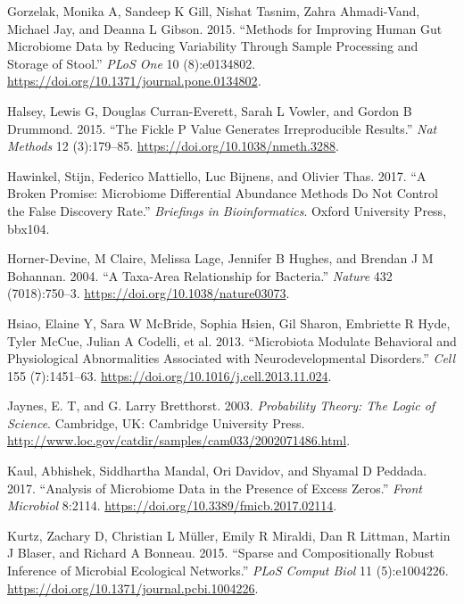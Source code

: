 \documentclass[onecolumn]{book}
\theoremstyle{definition}
\theoremstyle{definition}
\theoremstyle{definition}
\theoremstyle{remark}
\begin{document}
\leavevmode\hypertarget{ref-Gorzelak:2015aa}{}%
Gorzelak, Monika A, Sandeep K Gill, Nishat Tasnim, Zahra Ahmadi-Vand,
Michael Jay, and Deanna L Gibson. 2015. ``Methods for Improving Human
Gut Microbiome Data by Reducing Variability Through Sample Processing
and Storage of Stool.'' \emph{PLoS One} 10 (8):e0134802.
\url{https://doi.org/10.1371/journal.pone.0134802}.

\leavevmode\hypertarget{ref-Halsey:2015aa}{}%
Halsey, Lewis G, Douglas Curran-Everett, Sarah L Vowler, and Gordon B
Drummond. 2015. ``The Fickle P Value Generates Irreproducible Results.''
\emph{Nat Methods} 12 (3):179--85.
\url{https://doi.org/10.1038/nmeth.3288}.

\leavevmode\hypertarget{ref-hawinkel2017}{}%
Hawinkel, Stijn, Federico Mattiello, Luc Bijnens, and Olivier Thas.
2017. ``A Broken Promise: Microbiome Differential Abundance Methods Do
Not Control the False Discovery Rate.'' \emph{Briefings in
Bioinformatics}. Oxford University Press, bbx104.

\leavevmode\hypertarget{ref-Horner-Devine:2004aa}{}%
Horner-Devine, M Claire, Melissa Lage, Jennifer B Hughes, and Brendan J
M Bohannan. 2004. ``A Taxa-Area Relationship for Bacteria.''
\emph{Nature} 432 (7018):750--3.
\url{https://doi.org/10.1038/nature03073}.

\leavevmode\hypertarget{ref-Hsiao:2013}{}%
Hsiao, Elaine Y, Sara W McBride, Sophia Hsien, Gil Sharon, Embriette R
Hyde, Tyler McCue, Julian A Codelli, et al. 2013. ``Microbiota Modulate
Behavioral and Physiological Abnormalities Associated with
Neurodevelopmental Disorders.'' \emph{Cell} 155 (7):1451--63.
\url{https://doi.org/10.1016/j.cell.2013.11.024}.

\leavevmode\hypertarget{ref-Jaynes:2003}{}%
Jaynes, E. T, and G. Larry Bretthorst. 2003. \emph{Probability Theory:
The Logic of Science}. Cambridge, UK: Cambridge University Press.
\url{http://www.loc.gov/catdir/samples/cam033/2002071486.html}.

\leavevmode\hypertarget{ref-Kaul:2017aa}{}%
Kaul, Abhishek, Siddhartha Mandal, Ori Davidov, and Shyamal D Peddada.
2017. ``Analysis of Microbiome Data in the Presence of Excess Zeros.''
\emph{Front Microbiol} 8:2114.
\url{https://doi.org/10.3389/fmicb.2017.02114}.

\leavevmode\hypertarget{ref-Kurtz:2015}{}%
Kurtz, Zachary D, Christian L Müller, Emily R Miraldi, Dan R Littman,
Martin J Blaser, and Richard A Bonneau. 2015. ``Sparse and
Compositionally Robust Inference of Microbial Ecological Networks.''
\emph{PLoS Comput Biol} 11 (5):e1004226.
\url{https://doi.org/10.1371/journal.pcbi.1004226}.
\end{document}
